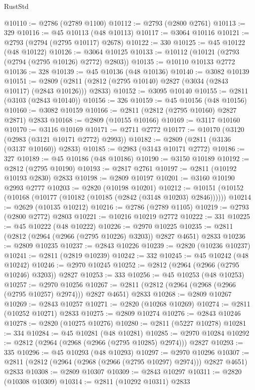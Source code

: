 \begin{lexlean}{RustStd}
\begin{coremodule}
@10110 := @2786 (@2789 @1100)
@10112 := @2793 (@2800 @2761)
@10113 := 329
@10116 := @45 @10113 (@48 @10113)
@10117 := @3064 @10116
@10121 := @2793 (@2794 (@2795 @10117) @2678)
@10122 := 330
@10125 := @45 @10122 (@48 @10122)
@10126 := @3064 @10125
@10133 := @10112 (@10121 (@2793 (@2794 (@2795 @10126) @2772) @2803))
@10135 := @10110 @10133 @2772
@10136 := 328
@10139 := @45 @10136 (@48 @10136)
@10140 := @3082 @10139
@10151 := @2809 (@2811 (@2812 (@2795 @10140) @2827 (@3034 (@2843 @10117) (@2843 @10126))) @2833)
@10152 := @3095 @10140
@10155 := @2811 (@3103 (@2843 @10140))
@10156 := 326
@10159 := @45 @10156 (@48 @10156)
@10160 := @3082 @10159
@10166 := @2811 (@2812 (@2795 @10160) @2827 @2871) @2833
@10168 := @2809 (@10155 @10166)
@10169 := @3117 @10160
@10170 := @3116 @10169
@10171 := @2711 @2772
@10177 := @10170 (@3120 (@2983 (@3121 @10171 @2772) @2993))
@10182 := @2809 (@2811 (@3136 (@3137 @10160)) @2833)
@10185 := @2983 (@3143 @10171 @2772)
@10186 := 327
@10189 := @45 @10186 (@48 @10186)
@10190 := @3150 @10189
@10192 := @2812 (@2795 @10190)
@10193 := @2817 @2761
@10197 := @2811 (@10192 @10193 @2830) @2833
@10198 := @2809 @10197
@10201 := @3160 @10190 @2993 @2777
@10203 := @2820 (@10198 @10201)
@10212 := @10151 (@10152 (@10168 (@10177 (@10182 (@10185 (@2842 (@3148 @10203) @2846))))))
@10214 := @2629 (@10135 @10212)
@10216 := @2786 (@2789 @1105)
@10219 := @2793 (@2800 @2772) @2803
@10221 := @10216 @10219 @2772
@10222 := 331
@10225 := @45 @10222 (@48 @10222)
@10226 := @2970 @10225
@10235 := @2811 (@2812 (@2964 (@2966 (@2795 @10226) @3203)) @2827 @4651) @2833
@10236 := @2809 @10235
@10237 := @2843 @10226
@10239 := @2820 (@10236 @10237)
@10241 := @2811 (@2819 @10239)
@10242 := 332
@10245 := @45 @10242 (@48 @10242)
@10246 := @2970 @10245
@10252 := @2812 (@2964 (@2966 (@2795 @10246) @3203)) @2827
@10253 := 333
@10256 := @45 @10253 (@48 @10253)
@10257 := @2970 @10256
@10267 := @2811 (@2812 (@2964 (@2968 (@2966 (@2795 @10257) @2974))) @2827 @4651) @2833
@10268 := @2809 @10267
@10269 := @2843 @10257
@10271 := @2820 (@10268 @10269)
@10274 := @2811 (@10252 @10271) @2833
@10275 := @2809 @10274
@10276 := @2843 @10246
@10278 := @2820 (@10275 @10276)
@10280 := @2811 (@5227 @10278)
@10281 := 334
@10284 := @45 @10281 (@48 @10281)
@10285 := @2970 @10284
@10292 := @2812 (@2964 (@2968 (@2966 (@2795 @10285) @2974))) @2827
@10293 := 335
@10296 := @45 @10293 (@48 @10293)
@10297 := @2970 @10296
@10307 := @2811 (@2812 (@2964 (@2968 (@2966 (@2795 @10297) @2974))) @2827 @4651) @2833
@10308 := @2809 @10307
@10309 := @2843 @10297
@10311 := @2820 (@10308 @10309)
@10314 := @2811 (@10292 @10311) @2833

\end{coremodule}
\end{lexlean}
